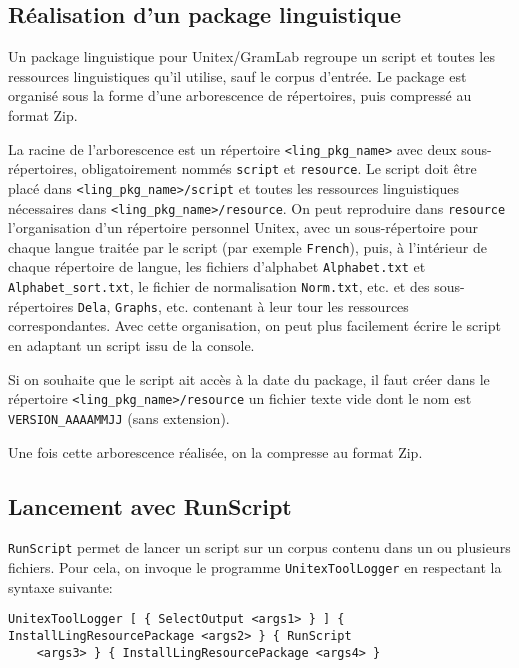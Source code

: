 \subsection{Réalisation d'un package linguistique}
\label{section-creation}

Un package linguistique pour Unitex/GramLab regroupe un script et toutes les ressources linguistiques
qu'il utilise, sauf le corpus d'entrée. Le package est organisé sous la forme d'une arborescence
de répertoires, puis compressé au format Zip.

\bigskip     {}
\noindent La racine de l'arborescence est un répertoire \verb$<ling_pkg_name>$ avec deux
sous-répertoires, obligatoirement nommés \verb$script$ et \verb$resource$. Le script doit être placé
dans \verb$<ling_pkg_name>/script$ et toutes les ressources linguistiques nécessaires dans
\verb$<ling_pkg_name>/resource$. On peut reproduire dans \verb$resource$ l'organisation d'un
répertoire personnel Unitex, avec un sous-répertoire pour chaque langue traitée par le script
(par exemple \verb$French$), puis, à l'intérieur de chaque répertoire de langue, les fichiers d'alphabet
\verb$Alphabet.txt$ et \verb$Alphabet_sort.txt$, le fichier de normalisation \verb$Norm.txt$, etc. et
des sous-répertoires \verb$Dela$, \verb$Graphs$, etc. contenant à leur tour les ressources
correspondantes. Avec cette organisation, on peut plus facilement écrire le script en adaptant un script
issu de la console.

\bigskip
\noindent Si on souhaite que le script ait accès à la date du package, il faut créer dans le
répertoire \verb$<ling_pkg_name>/resource$ un fichier texte vide dont le nom est
\verb$VERSION_AAAAMMJJ$ (sans extension).

\bigskip
\noindent Une fois cette arborescence réalisée, on la compresse au format Zip.

\subsection{Lancement avec RunScript}
\label{section-runscript}
\verb$RunScript$ permet de lancer un script sur un corpus contenu dans un ou plusieurs fichiers.
Pour cela, on invoque le programme \verb$UnitexToolLogger$ en respectant la syntaxe suivante:

\begin{Verbatim}[fontsize=\small,fontfamily=helvetica]
UnitexToolLogger [ { SelectOutput <args1> } ] { InstallLingResourcePackage <args2> } { RunScript
    <args3> } { InstallLingResourcePackage <args4> }
\end{Verbatim}

